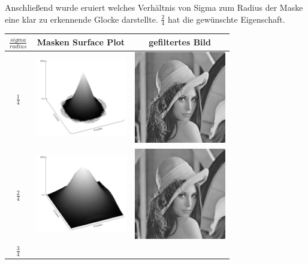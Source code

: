 \documentclass[12pt,german]{article}
\begin{document}
Anschließend wurde eruiert welches Verhältnis von Sigma zum Radius der Maske eine klar zu erkennende Glocke darstellte. $ \frac{2}{4} $ hat die gewünschte Eigenschaft. 
\begin{table}[h]
  \centering
  \begin{tabular}{| c | c | c |}
    \hline
    $ \frac{sigma}{radius} $ & Masken Surface Plot & gefiltertes Bild \\
    \hline
    $ \frac{1}{4} $ &
	\includegraphics[width=4cm]{../testData/Gauss/GaussBellR4S1.jpg} & 	\includegraphics[width=4cm]{../testData/Gauss/LenaR4S1.jpg} \\
	    \hline
    $ \frac{2}{4} $ &
	\includegraphics[width=4cm]{../testData/Gauss/GaussBellR4S2.jpg} & 	\includegraphics[width=4cm]{../testData/Gauss/LenaR4S2.jpg} \\
	    \hline
    $ \frac{3}{4} $ &

\end{tabular}
\end{table}
\end{document}
